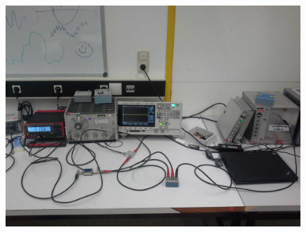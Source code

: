 
\FloatBarrier\begin{figure}[!h]
\centering
\includegraphics[scale=1]{../Grafiken/Versuchsaufbau_e_PhasenempfindlicherGleichrichter.jpg}
\caption{\label{fig:versuchsaufbau_e_phasenempfindlichergleichrichter}}
\end{figure}
\FloatBarrier